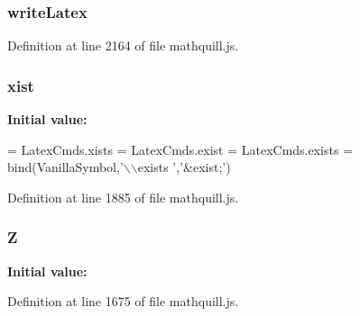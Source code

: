 \subsubsection[{write\-Latex}]{\setlength{\rightskip}{0pt plus 5cm}{\bf \-\_\-} write\-Latex}\label{mathquill_8js_a3c0a9d6d517decc037e1558163cbc494}


Definition at line 2164 of file mathquill.\-js.

\subsubsection[{xist}]{ xist}\label{mathquill_8js_a0ca43e4b000e093f61237284bd72cad1}
{\bfseries Initial value\-:}
\begin{DoxyCode}
= 
LatexCmds.xists = LatexCmds.exist = LatexCmds.exists =
  bind(VanillaSymbol,\textcolor{stringliteral}{'\(\backslash\)\(\backslash\)exists '},\textcolor{stringliteral}{'&exist;'})
\end{DoxyCode}


Definition at line 1885 of file mathquill.\-js.

\subsubsection[{Z}]{ Z}\label{mathquill_8js_a6c8a59024ca8b8c8495c07b0c36e2451}
{\bfseries Initial value\-:}


Definition at line 1675 of file mathquill.\-js.

